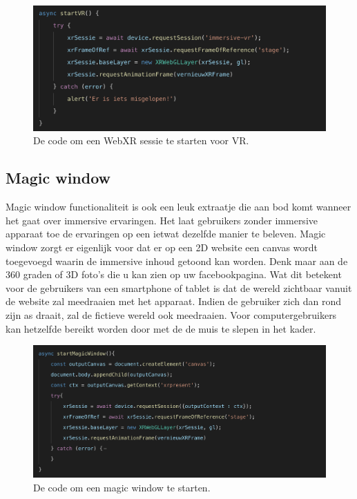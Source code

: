 \begin{figure}
	\includegraphics[width=\linewidth]{img/startVR.png}
	\caption{De code om een WebXR sessie te starten voor VR.}
	\label{fig-startVR}
\end{figure}

\subsection{Magic window}
\label{sec:magic-window}
Magic window functionaliteit is ook een leuk extraatje die aan bod komt wanneer het gaat over immersive ervaringen. Het laat gebruikers zonder immersive apparaat toe de ervaringen op een ietwat dezelfde manier te beleven. Magic window zorgt er eigenlijk voor dat er op een 2D website een canvas wordt toegevoegd waarin de immersive inhoud getoond kan worden. Denk maar aan de 360 graden of 3D foto's die u kan zien op uw facebookpagina. Wat dit betekent voor de gebruikers van een smartphone of tablet is dat de wereld zichtbaar vanuit de website zal meedraaien met het apparaat. Indien de gebruiker zich dan rond zijn as draait, zal de fictieve wereld ook meedraaien. Voor computergebruikers kan hetzelfde bereikt worden door met de de muis te slepen in het kader. 

\begin{figure}
	\includegraphics[width=\linewidth]{img/magicWindow.png}
	\caption{De code om een magic window te starten.}
	\label{fig-magic-window}
\end{figure}

